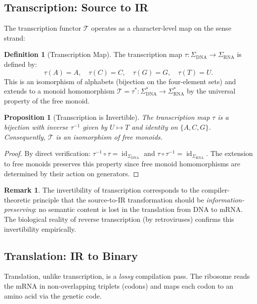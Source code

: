 \documentclass[12pt,a4paper]{article}
\newtheorem{proposition}[theorem]{Proposition}
\theoremstyle{definition}
\newtheorem{definition}[theorem]{Definition}
\newtheorem{remark}[theorem]{Remark}
\newcommand{\id}{\operatorname{id}}
\begin{document}
\subsection{Transcription: Source to IR}

The transcription functor $\mathcal{T}$ operates as a character-level map on the sense strand:

\begin{definition}[Transcription Map]\label{def:transcription}
The transcription map $\tau \colon \Sigma_{\mathrm{DNA}} \to \Sigma_{\mathrm{RNA}}$ is defined by:
\[
  \tau(A) = A, \quad \tau(C) = C, \quad \tau(G) = G, \quad \tau(T) = U.
\]
This is an isomorphism of alphabets (bijection on the four-element sets) and extends to a monoid homomorphism $\mathcal{T} = \tau^* \colon \Sigma_{\mathrm{DNA}}^* \to \Sigma_{\mathrm{RNA}}^*$ by the universal property of the free monoid.
\end{definition}

\begin{proposition}[Transcription is Invertible]\label{prop:transcription-iso}
The transcription map $\tau$ is a bijection with inverse $\tau^{-1}$ given by $U \mapsto T$ and identity on $\{A, C, G\}$. Consequently, $\mathcal{T}$ is an isomorphism of free monoids.
\end{proposition}

\begin{proof}
By direct verification: $\tau^{-1} \circ \tau = \id_{\Sigma_\mathrm{DNA}}$ and $\tau \circ \tau^{-1} = \id_{\Sigma_\mathrm{RNA}}$. The extension to free monoids preserves this property since free monoid homomorphisms are determined by their action on generators.
\end{proof}

\begin{remark}
The invertibility of transcription corresponds to the compiler-theoretic principle that the source-to-IR transformation should be \emph{information-preserving}: no semantic content is lost in the translation from DNA to mRNA. The biological reality of reverse transcription (by retroviruses) confirms this invertibility empirically.
\end{remark}

\subsection{Translation: IR to Binary}

Translation, unlike transcription, is a \emph{lossy} compilation pass. The ribosome reads the mRNA in non-overlapping triplets (codons) and maps each codon to an amino acid via the genetic code.
\end{document}
